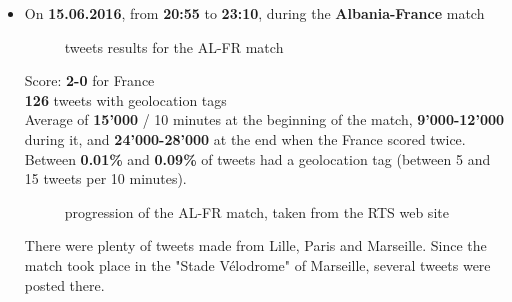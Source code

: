 \documentclass[a4paper,11pt]{report}
\begin{document}
\begin{itemize}
	\item On \textbf{15.06.2016}, from \textbf{20:55} to \textbf{23:10}, during the \textbf{Albania-France} match
	\begin{figure}[H]
	\vspace{-5pt}
	\begin{center}
	\vspace{-5pt}
	\caption{tweets results for the AL-FR match}
	\end{center}
	\end{figure}
	\vspace{-20pt}
	Score: \textbf{2-0} for France\\
	\textbf{126} tweets with geolocation tags\\
	Average of \textbf{15'000} / 10 minutes at the beginning of the match, \textbf{9'000-12'000} during it, and \textbf{24'000-28'000} at the end when the France scored twice.
	Between \textbf{0.01\%} and \textbf{0.09\%} of tweets had a geolocation tag (between 5 and 15 tweets per 10 minutes).
	\begin{figure}[H]
	\vspace{-5pt}
	\begin{center}
	\vspace{-5pt}
	\caption{progression of the AL-FR match, taken from the RTS web site}
	\end{center}
	\end{figure}
	\vspace{-20pt}
	There were plenty of tweets made from Lille, Paris and Marseille. Since the match took place in the "Stade Vélodrome" of Marseille, several tweets were posted there.

\end{itemize}
\end{document}
